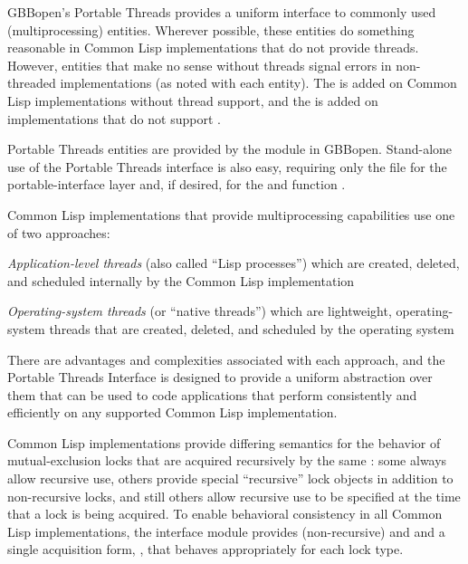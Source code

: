 \documentclass[10pt,twoside,english,pdftex]{article}
\begin{document}
%
%
GBBopen's Portable Threads provides a uniform interface to commonly used
 (multiprocessing) entities.  Wherever possible, these entities
do something reasonable in Common Lisp implementations that do not provide
threads. However, entities that make no sense without threads signal errors in
non-threaded implementations (as noted with each entity).  The 
 is added on Common Lisp implementations
without thread support, and the 
 is added on implementations that do
not support .

Portable Threads entities are provided by the 
module in GBBopen.  Stand-alone use of the Portable Threads interface is also
easy, requiring only the
file for the portable-interface layer and, if desired,
for the  and  function
.


Common Lisp implementations that provide multiprocessing capabilities use one
of two approaches:
\begin{tightitemize}
\item \textit{Application-level threads\/} (also called ``Lisp processes'')
  which are created, deleted, and scheduled internally by the Common Lisp
  implementation
\item \textit{Operating-system threads\/} (or ``native threads'') which are
  lightweight, operating-system threads that are created, deleted, and
  scheduled by the operating system
\end{tightitemize}

There are advantages and complexities associated with each approach, and the
Portable Threads Interface is designed to provide a uniform abstraction over
them that can be used to code applications that perform consistently and
efficiently on any supported Common Lisp implementation.


Common Lisp implementations provide differing semantics for the behavior of
mutual-exclusion locks that are acquired recursively by the same
: some always allow recursive use, others provide special
``recursive'' lock objects in addition to non-recursive locks, and still
others allow recursive use to be specified at the time that a lock is being
acquired.  To enable behavioral consistency in all Common Lisp
implementations, the  interface module provides
(non-recursive)  and  and a single
acquisition form, , that behaves
appropriately for each lock type.
\end{document}
